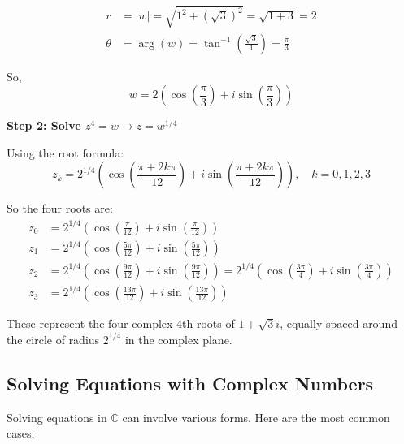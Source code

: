 \begin{align*}
	r      & = |w| = \sqrt{1^2 + (\sqrt{3})^2} = \sqrt{1 + 3} = 2                    \\
	\theta & = \arg(w) = \tan^{-1} \left( \frac{\sqrt{3}}{1} \right) = \frac{\pi}{3}
\end{align*}

So,
\[
	w = 2 \left( \cos\left( \frac{\pi}{3} \right) + i \sin\left( \frac{\pi}{3} \right) \right)
\]

\textbf{Step 2: Solve \( z^4 = w \to z = w^{1/4} \)}

Using the root formula:
\[
	z_k = 2^{1/4} \left( \cos\left( \frac{\pi + 2k\pi}{12} \right) + i \sin\left( \frac{\pi + 2k\pi}{12} \right) \right), \quad k = 0, 1, 2, 3
\]

So the four roots are:
\begin{align*}
	z_0 & = 2^{1/4} \left( \cos\left( \frac{\pi}{12} \right) + i \sin\left( \frac{\pi}{12} \right) \right)                                                                                                    \\
	z_1 & = 2^{1/4} \left( \cos\left( \frac{5\pi}{12} \right) + i \sin\left( \frac{5\pi}{12} \right) \right)                                                                                                  \\
	z_2 & = 2^{1/4} \left( \cos\left( \frac{9\pi}{12} \right) + i \sin\left( \frac{9\pi}{12} \right) \right) = 2^{1/4} \left( \cos\left( \frac{3\pi}{4} \right) + i \sin\left( \frac{3\pi}{4} \right) \right) \\
	z_3 & = 2^{1/4} \left( \cos\left( \frac{13\pi}{12} \right) + i \sin\left( \frac{13\pi}{12} \right) \right)
\end{align*}

These represent the four complex 4th roots of \( 1 + \sqrt{3}i \), equally spaced around the circle of radius \( 2^{1/4} \) in the complex plane.

\subsection{Solving Equations with Complex Numbers}

Solving equations in \( \mathbb{C} \) can involve various forms. Here are the most common cases:

